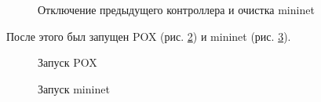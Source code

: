 \documentclass[a4paper, 14pt]{extarticle}
\begin{document}
\begin{figure}[H]
  \centering
  \caption{Отключение предыдущего контроллера и очистка mininet}
  \label{fig:mininet-cleanup}
\end{figure}

После этого был запущен POX (рис. \ref{fig:pox}) и mininet (рис.
\ref{fig:mininet-start}).

\begin{figure}[H]
  \centering
  \caption{Запуск POX}
  \label{fig:pox}
\end{figure}

\begin{figure}[H]
  \centering
  \caption{Запуск mininet}
  \label{fig:mininet-start}
\end{figure}
\end{document}
